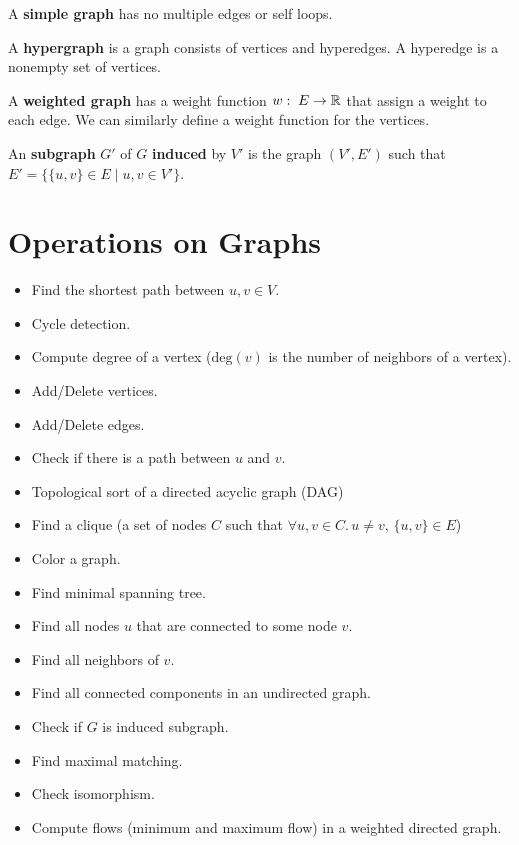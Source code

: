A \textbf{simple graph} has no multiple edges or self loops.

A \textbf{hypergraph} is a graph consists of vertices and hyperedges. A hyperedge is a nonempty set of vertices.

A \textbf{weighted graph} has a weight function $w:\; E \to \mathbb{R}$ that assign a weight to each edge. We can similarly define a weight function for the vertices.

An \textbf{subgraph} $G'$ of $G$ \textbf{induced} by $V'$ is the graph $(V',E')$ such that $E' = \{ \{u,v\} \in E \mid u,v \in V' \}$. 

\section{Operations on Graphs}

\begin{multicols}{2}
    \begin{itemize}
        \item Find the shortest path between $u,v\in V$.
        \item Cycle detection.
        \item Compute degree of a vertex ($\mathrm{deg}(v)$ is the number of neighbors of a vertex).
        \item Add/Delete vertices.
        \item Add/Delete edges.
        \item Check if there is a path between $u$ and $v$.
        \item Topological sort of a directed acyclic graph (DAG)
        \item Find a clique (a set of nodes $C$ such that $\forall u,v \in C.\, u \neq v,\, \{u,v\} \in E$)
        \item Color a graph.
        \item Find minimal spanning tree.
        \item Find all nodes $u$ that are connected to some node $v$.
        \item Find all neighbors of $v$.
        \item Find all connected components in an undirected graph.
        \item Check if $G$ is induced subgraph.
        \item Find maximal matching.
        \item Check isomorphism.
        \item Compute flows (minimum and maximum flow) in a weighted directed graph.
    \end{itemize}
\end{multicols}

